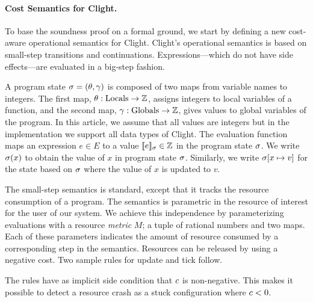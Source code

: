 \documentclass{sigplanconf}
\newcommand{\iffull}[2]{\ifx\fullversion\undefined{#2}\else{#1}\fi}
\newcommand{\ifshort}[2]{\ifx\fullversion\undefined{#1}\else{#2}\fi}
\newcommand{\paraskip}[0]{\ifshort{\vspace{-4pt}}{}}
\begin{document}
\paraskip
\paragraph{Cost Semantics for Clight.}
To base the soundness proof on a formal ground, we start by defining a
new cost-aware operational semantics for Clight.  Clight's
operational semantics is based on small-step transitions and
continuations.  Expressions---which do not have side effects---are
evaluated in a big-step fashion.

A program state $\sigma = (\theta, \gamma)$ is composed of two maps
from variable names to integers. The first map, $\theta : \text{Locals}
\to \mathbb{Z}$, assigns integers to local variables of a function, and the
second map, $\gamma : \text{Globals} \to \mathbb{Z}$, gives values to global
variables of the program.  In this article, we assume that all values are
integers but in the implementation we support all data types of Clight.
The evaluation function \evalE{\cdot}{} maps an expression $e \in E$
to a value $\llbracket e \rrbracket_{\sigma} \in \mathbb{Z}$ in the program state $\sigma$.
We write $\sigma(x)$ to obtain the value of $x$ in program state
$\sigma$.
Similarly, we write $\sigma[x \mapsto v]$ for the state based on $\sigma$
where the value of $x$ is updated to $v$.

The small-step semantics is standard, except that it tracks
the resource consumption of a program.  The semantics is parametric in
the resource of interest for the user of our system.  We achieve this
independence by parameterizing evaluations with a resource \emph{metric}
$M$; a tuple of rational numbers and two maps.  Each of these
parameters indicates the amount of resource consumed by a corresponding
step in the semantics.  Resources can be released by using a negative
cost. %
Two sample rules for update and tick follow.
The rules have as implicit side condition that $c$ is
non-negative.  This makes it possible to detect a resource crash as a
stuck configuration where $c<0$.
\end{document}
